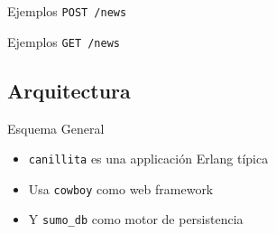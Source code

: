 \documentclass[utf8,hyperref={colorlinks=true}]{beamer}
\begin{document}
\begin{frame}[t]{Ejemplos}
\alert{\texttt{POST /news}}
\postsample
{}\postsampleresp
\end{frame}

\begin{frame}[t]{Ejemplos}
\alert{\texttt{GET /news}}
\getsample
{}
\getsampleresphh
{}\getsamplerespa
{}\getsamplerespb
\end{frame}

\subsection{Arquitectura}
\begin{frame}{Esquema General}
\begin{itemize}
	\item<+-> \texttt{canillita} es una applicaci\'on Erlang t\'ipica
	\item<+-> Usa \texttt{cowboy} como web framework
	\item<+-> Y \texttt{sumo\_db} como motor de persistencia
\end{itemize}
\end{frame}
\end{document}
